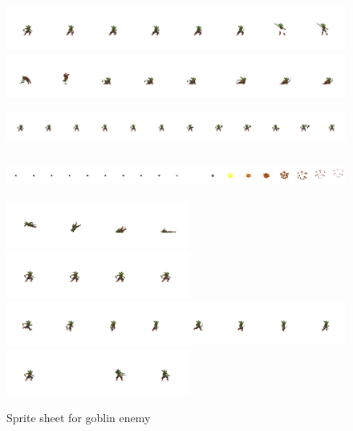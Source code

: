 \documentclass{article}
\begin{document}
\begin{figure}[H]
\centering
\includegraphics[height = 1.5cm]{goblin_Attack}
\includegraphics[height = 1.5cm]{goblin_Attack2}
\includegraphics[height = 1.5cm]{goblin_Attack3}
\includegraphics[height = 1.5cm]{goblin_Bomb_sprite}
\includegraphics[height = 1.5cm]{goblin_Death}
\includegraphics[height = 1.5cm]{goblin_Idle}
\includegraphics[height = 1.5cm]{goblin_Run}
\includegraphics[height = 1.5cm]{goblin_Take Hit}
\caption{Sprite sheet for goblin enemy}
\label{goblin_sprite}
\end{figure}
\end{document}
